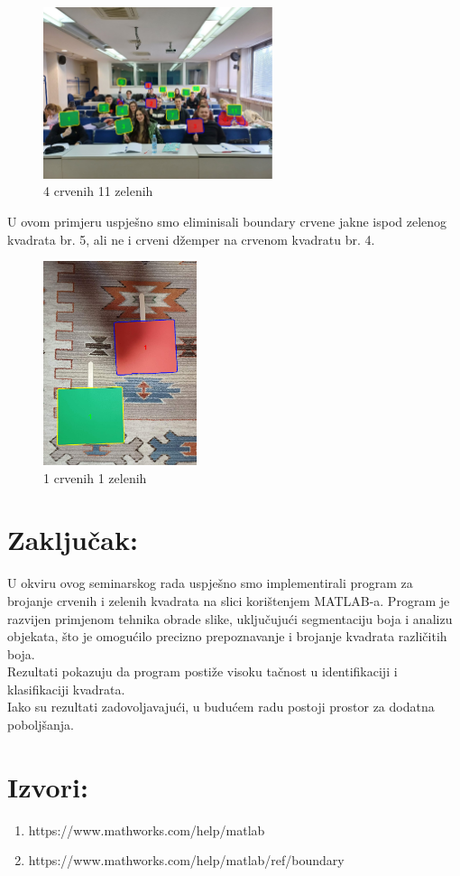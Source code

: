 \documentclass[a4paper,12pt]{article}
\begin{document}
\begin{figure}[htbp]
    \centering
    \includegraphics[width=0.6\textwidth]{studenti2.png}
    \caption{4 crvenih 11 zelenih}
    \label{fig:example}
\end{figure}
U ovom primjeru uspješno smo eliminisali boundary crvene jakne ispod zelenog kvadrata br. 5, ali ne i crveni džemper na crvenom kvadratu br. 4.
\begin{figure}[htbp]
    \centering
    \includegraphics[width=0.4\textwidth]{kvadrati_test.png}
    \caption{1 crvenih 1 zelenih}
    \label{fig:example}
\end{figure}
\newpage
\section{Zaključak:}
U okviru ovog seminarskog rada uspješno smo implementirali program za brojanje crvenih i zelenih kvadrata na slici korištenjem MATLAB-a. Program je razvijen primjenom tehnika obrade slike, uključujući segmentaciju boja i analizu objekata, što je omogućilo precizno prepoznavanje i brojanje kvadrata različitih boja.
\\

Rezultati pokazuju da program postiže visoku tačnost u identifikaciji i klasifikaciji kvadrata.
\\

Iako su rezultati zadovoljavajući, u budućem radu postoji prostor za dodatna poboljšanja.

\newpage
\section{Izvori:}

\begin{enumerate}
	\item https://www.mathworks.com/help/matlab
	\item https://www.mathworks.com/help/matlab/ref/boundary
\end{enumerate}
\end{document}
